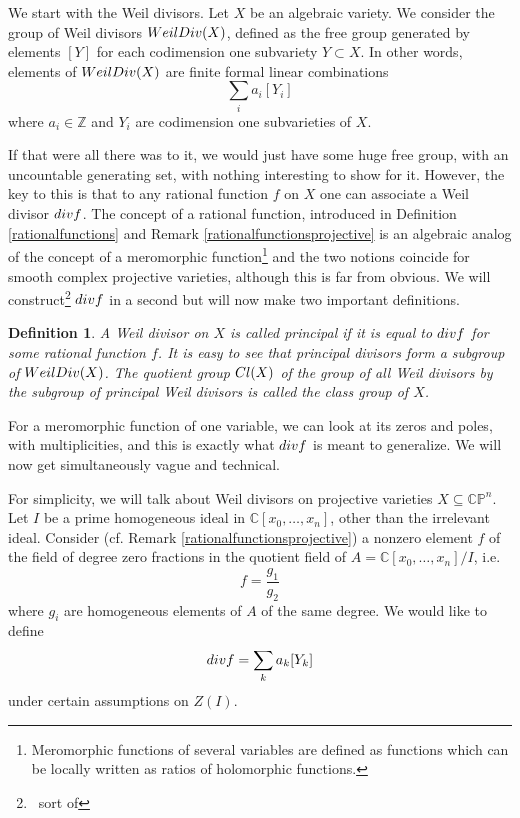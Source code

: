 \documentclass[11pt]{article}
\numberwithin{equation}{section}
\numberwithin{footnote}{section}
\newtheorem{defn}[thm]{Definition}
\newcommand{\blue}{\color{blue}}
\renewcommand{\P}{{\mathbb P}}
\newcommand{\Z}{{\mathbb Z}}
\newcommand{\C}{{\mathbb C}}
\begin{document}
\smallskip
We start with the Weil divisors.
Let $X$ be an algebraic variety. We consider the group of Weil divisors  ${\rm WeilDiv}(X)$, defined as the free group generated by elements $[Y]$  {\blue for each codimension one subvariety} $Y\subset X$. In other words, elements of ${\rm WeilDiv}(X)$ are finite formal linear combinations 
$$
\sum_{i} a_i [Y_i]
$$
where $a_i\in \Z$ and $Y_i$ are codimension one subvarieties of $X$.

\smallskip
If that were all there was to it, we would just have some huge free group, with an uncountable generating set, with nothing interesting to show for it. However, the key to this is that to any rational function $f$ on $X$ one can associate a Weil divisor ${\rm div} f$. 
The concept of a rational function, introduced in Definition \ref{rationalfunctions} and Remark \ref{rationalfunctionsprojective} 
is an algebraic analog of the concept of a meromorphic function\footnote{ Meromorphic functions of several variables are defined as functions which can be locally written as ratios of holomorphic functions.} and the two notions coincide for smooth complex projective varieties, although this is far from obvious. We will construct\footnote{\blue ~sort of} ${\rm div}f$ in a second but will now make two important definitions.

\smallskip
\begin{defn}\label{classgroup}
A Weil divisor on $X$ is called {\blue principal} if it is equal to ${\rm div}f$ for some rational function $f$. It is easy to see that principal divisors form a subgroup of ${\rm WeilDiv}(X)$. The quotient group   ${\rm Cl}(X)$ of the group of all Weil divisors by the subgroup of principal Weil divisors is called the {\blue class group} of $X$.
\end{defn}

\smallskip
For a meromorphic function of one variable, we can look at its zeros and poles, with multiplicities, and this is exactly what ${\rm div}f$ is meant to generalize. We will now get simultaneously vague and technical. 

\smallskip
For simplicity, we will talk about Weil divisors on projective varieties $X\subseteq \C\P^n$.
Let $I$ be a prime homogeneous ideal in $\C[x_0,\ldots,x_n]$, other than the irrelevant ideal. Consider (cf. Remark \ref{rationalfunctionsprojective}) a nonzero element $f$ of the field of degree zero fractions in the quotient field of $A=\C[x_0,\ldots,x_n]/I$, i.e.
$$
f = \frac {g_1}{g_2} 
$$
where $g_i$ are homogeneous elements of $A$ of the same degree. We would like to define 
$${\rm div}f = \sum_k a_k [Y_k]$$
under certain assumptions on $Z(I)$.
\end{document}
